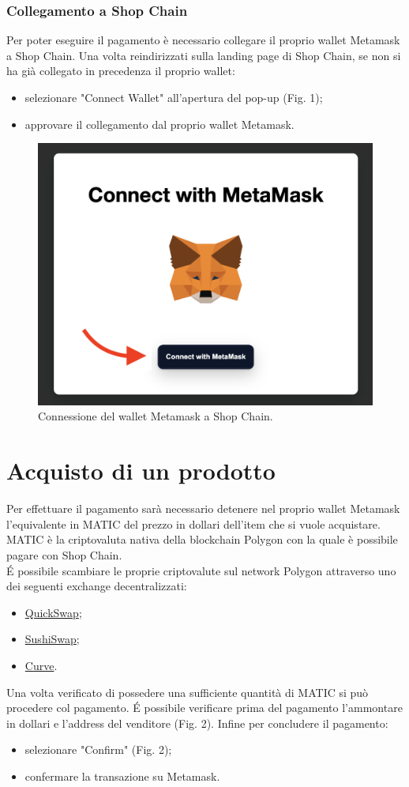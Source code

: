 \documentclass[a4paper, 12pt]{article}
\begin{document}
\subsubsection{Collegamento a Shop Chain}
Per poter eseguire il pagamento è necessario collegare il proprio wallet Metamask a Shop Chain. Una volta reindirizzati sulla landing page di Shop Chain, se non si ha già collegato in precedenza il proprio wallet:
\begin {itemize}
\item selezionare "Connect Wallet" all'apertura del pop-up (Fig. 1);
\item approvare il collegamento dal proprio wallet Metamask.
\end{itemize}

\FloatBarrier
\begin{figure}[!h]
\centering
\includegraphics[width=0.5\linewidth]{img/connessione_wallet.png}
\caption{Connessione del wallet Metamask a Shop Chain.}
\end{figure}
\FloatBarrier

\section{Acquisto di un prodotto}
Per effettuare il pagamento sarà necessario detenere nel proprio wallet Metamask l'equivalente in MATIC del prezzo in dollari dell'item che si vuole acquistare. MATIC è la criptovaluta nativa della blockchain Polygon con la quale è possibile pagare con Shop Chain.
\\É possibile scambiare le proprie criptovalute sul network Polygon attraverso uno dei seguenti exchange decentralizzati:

\begin{itemize}
\item \href{https://www.quickswap.exchange}{QuickSwap};
\item \href{https://app.sushi.com/}{SushiSwap};
\item \href{https://polygon.curve.fi/}{Curve}.
\end{itemize}
Una volta verificato di possedere una sufficiente quantità di MATIC si può procedere col pagamento. É possibile verificare prima del pagamento l'ammontare in dollari e l'address del venditore (Fig. 2). Infine per concludere il pagamento:
\begin{itemize}
\item selezionare "Confirm" (Fig. 2);
\item confermare la transazione su Metamask.
\end{itemize}
\end{document}
